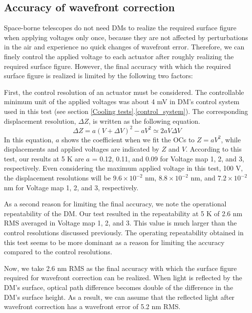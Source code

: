 \documentclass[a4paper]{article}
\begin{document}
\subsection{Accuracy of wavefront correction}
Space-borne telescopes do not need DMs to realize the required surface figure when applying voltages only once, because they are not affected by perturbations in the air and experience no quick changes of wavefront error. Therefore, we can finely control the applied voltage to each actuator after roughly realizing the required surface figure. However, the final accuracy with which the required surface figure is realized is limited by the following two factors:

First, the control resolution of an actuator must be considered. The controllable minimum unit of the applied voltages was about 4 mV in DM's control system used in this test (see section \ref{Cooling tests}.\ref{control_system}). The corresponding displacement resolution, $\Delta Z$, is written as the following equation. 
\begin{equation}
\Delta Z = a(V + \Delta V)^{2} - aV^{2} \simeq 2aV \Delta V
\end{equation}
In this equation, $a$ shows the coefficient when we fit the OCs to $Z = a V^{2}$, while displacements and applied voltages are indicated by $Z$ and $V$. According to this test, our results at 5 K are $a$ = 0.12, 0.11, and 0.09 for Voltage map 1, 2, and 3, respectively. Even considering the maximum applied voltage in this test, 100 V, the displacement resolutions will be $9.6\times10^{-2}$ nm, $8.8\times10^{-2}$ nm, and $7.2\times10^{-2}$ nm for Voltage map 1, 2, and 3, respectively.

As a second reason for limiting the final accuracy, we note the operational repeatability of the DM. Our test resulted in the repeatability at 5 K of 2.6 nm RMS averaged in Voltage map 1, 2, and 3. This value is much larger than the control resolutions discussed previously. The operating repeatability obtained in this test seems to be more dominant as a reason for limiting the accuracy compared to the control resolutions.

Now, we take 2.6 nm RMS as the final accuracy with which the surface figure required for wavefront correction can be realized. When light is reflected by the DM's surface, optical path difference becomes double of the difference in the DM's surface height. As a result, we can assume that the reflected light after wavefront correction has a wavefront error of 5.2 nm RMS.
\end{document}
